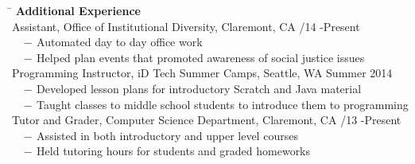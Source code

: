 \documentclass[12pt]{article}
\newcommand{\sectionNL}{\\[2pt]}
\newcommand{\customtab}{$\hspace{10pt} - \hspace{2pt}$}
\newcommand{\customtabinline}{$\hspace{23pt}$}
\begin{document}
\begin{tabbing} 
\hspace*{6.5in}\= \kill
{\textbf{Additional Experience } } \> \sectionNL
Assistant, Office of Institutional Diversity, Claremont, CA /14 -Present \\
\customtab Automated day to day office work \\
\customtab Helped plan events that promoted awareness of social justice issues \\

Programming Instructor, iD Tech Summer Camps, Seattle, WA \> Summer 2014 \\
\customtab Developed lesson plans for introductory Scratch and Java material \\
\customtab Taught classes to middle school students to introduce them to programming  \\

Tutor and Grader, Computer Science Department, Claremont, CA /13 -Present \\ %
\customtab Assisted in both introductory and upper level courses \\
\customtab Held tutoring hours for students and graded homeworks
\end{tabbing}
\end{document}
